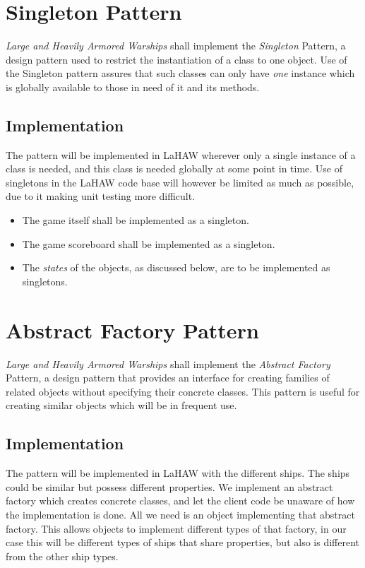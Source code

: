     \section{Singleton Pattern}
    \emph{Large and Heavily Armored Warships} shall implement the \emph{Singleton} Pattern, a design pattern used to restrict the instantiation of a class to one object\cite{singleton}.
    Use of the Singleton pattern assures that such classes can only have \emph{one} instance which is globally available to those in need of it and its methods.
    
        \subsection{Implementation}
        The pattern will be implemented in LaHAW wherever only a single instance of a class is needed, and this class is needed globally at some point in time. Use of singletons in the LaHAW code base will however be limited as much as possible, due to it making unit testing more difficult\cite{singleton_unit_testing}.
    
        \begin{itemize}
            \item The game itself shall be implemented as a singleton.
            \item The game scoreboard shall be implemented as a singleton.
            \item The \emph{states} of the objects, as discussed below, are to be implemented as singletons.
        \end{itemize}
    
    

\section{Abstract Factory Pattern}
\emph{Large and Heavily Armored Warships} shall implement the \emph{Abstract Factory} Pattern, a design pattern that provides an interface for creating families of related objects without specifying their concrete classes\cite{abstractfactory}. This pattern is useful for creating similar objects which will be in frequent use.


    \subsection{Implementation}
    The pattern will be implemented in LaHAW with the different ships. The ships could be similar but possess different properties. We implement an abstract factory which creates concrete classes, and let the client code be unaware of how the implementation is done. All we need is an object implementing that abstract factory. This allows objects to implement different types of that factory, in our case this will be different types of ships that share properties, but also is different from the other ship types.

